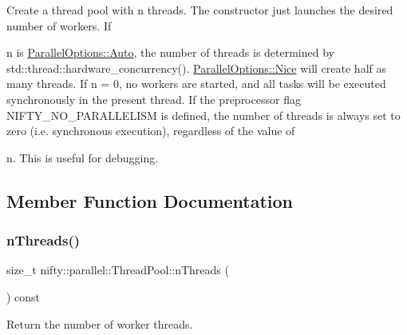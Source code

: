 Create a thread pool with n threads. The constructor just launches the desired number of workers. If \begin{DoxyItemize}
\item n is {\ttfamily \hyperlink{classnifty_1_1parallel_1_1ParallelOptions_a7a945e8bd698883de4af0f906b2aa88aa0bd8f9fd00d78fcfdcb6ee1575f43fd6}{Parallel\+Options\+::\+Auto}}, the number of threads is determined by {\ttfamily std\+::thread\+::hardware\+\_\+concurrency()}. {\ttfamily \hyperlink{classnifty_1_1parallel_1_1ParallelOptions_a7a945e8bd698883de4af0f906b2aa88aad7df42230112f42413aa5fc2b3671651}{Parallel\+Options\+::\+Nice}} will create half as many threads. If {\ttfamily n = 0}, no workers are started, and all tasks will be executed synchronously in the present thread. If the preprocessor flag {\ttfamily N\+I\+F\+T\+Y\+\_\+\+N\+O\+\_\+\+P\+A\+R\+A\+L\+L\+E\+L\+I\+SM} is defined, the number of threads is always set to zero (i.\+e. synchronous execution), regardless of the value of \item n. This is useful for debugging. \end{DoxyItemize}


\subsection{Member Function Documentation}
\mbox{\label{classnifty_1_1parallel_1_1ThreadPool_aa826f97a6941c9dc9d3b265240077875}} 
\subsubsection{\texorpdfstring{n\+Threads()}{nThreads()}}
{\footnotesize\ttfamily size\+\_\+t nifty\+::parallel\+::\+Thread\+Pool\+::n\+Threads (\begin{DoxyParamCaption}{ }\end{DoxyParamCaption}) const\hspace{0.3cm}{\ttfamily [inline]}}

Return the number of worker threads. \mbox{\label{classnifty_1_1parallel_1_1ThreadPool_a72bcedd7dfdb99fe347ee9da0a80cabd}} 
